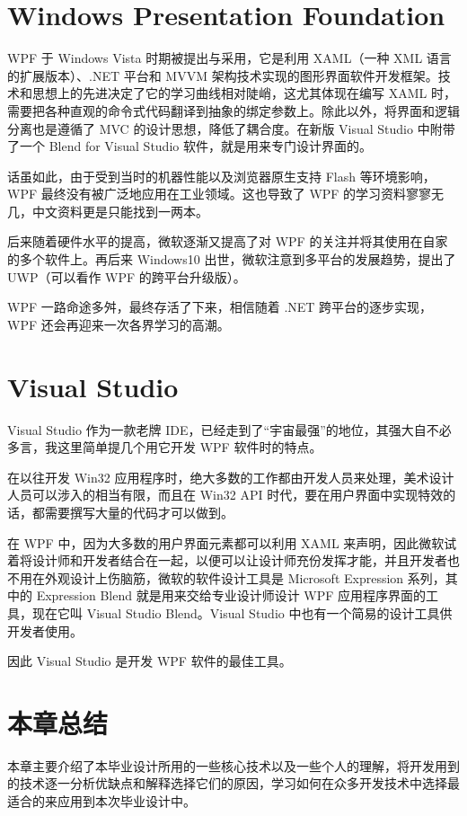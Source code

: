 \section{Windows Presentation Foundation}

WPF 于 Windows Vista 时期被提出与采用，它是利用 XAML（一种 XML 语言的扩展版本）、.NET 平台和 MVVM 架构技术实现的图形界面软件开发框架。技术和思想上的先进决定了它的学习曲线相对陡峭，这尤其体现在编写 XAML 时，需要把各种直观的命令式代码翻译到抽象的绑定参数上。除此以外，将界面和逻辑分离也是遵循了 MVC 的设计思想，降低了耦合度。在新版 Visual Studio 中附带了一个 Blend for Visual Studio 软件，就是用来专门设计界面的。

话虽如此，由于受到当时的机器性能以及浏览器原生支持 Flash 等环境影响，WPF 最终没有被广泛地应用在工业领域。这也导致了 WPF 的学习资料寥寥无几，中文资料更是只能找到一两本。

后来随着硬件水平的提高，微软逐渐又提高了对 WPF 的关注并将其使用在自家的多个软件上。再后来 Windows10 出世，微软注意到多平台的发展趋势，提出了 UWP（可以看作 WPF 的跨平台升级版）。

WPF 一路命途多舛，最终存活了下来，相信随着 .NET 跨平台的逐步实现，WPF 还会再迎来一次各界学习的高潮。

\section{Visual Studio}

Visual Studio 作为一款老牌 IDE，已经走到了``宇宙最强''的地位，其强大自不必多言，我这里简单提几个用它开发 WPF 软件时的特点。

在以往开发 Win32 应用程序时，绝大多数的工作都由开发人员来处理，美术设计人员可以涉入的相当有限，而且在 Win32 API 时代，要在用户界面中实现特效的话，都需要撰写大量的代码才可以做到。

在 WPF 中，因为大多数的用户界面元素都可以利用 XAML 来声明，因此微软试着将设计师和开发者结合在一起，以便可以让设计师充份发挥才能，并且开发者也不用在外观设计上伤脑筋，微软的软件设计工具是 Microsoft Expression 系列，其中的 Expression Blend 就是用来交给专业设计师设计 WPF 应用程序界面的工具，现在它叫 Visual Studio Blend。Visual Studio 中也有一个简易的设计工具供开发者使用。

因此 Visual Studio 是开发 WPF 软件的最佳工具。

\section{本章总结}

本章主要介绍了本毕业设计所用的一些核心技术以及一些个人的理解，将开发用到的技术逐一分析优缺点和解释选择它们的原因，学习如何在众多开发技术中选择最适合的来应用到本次毕业设计中。
